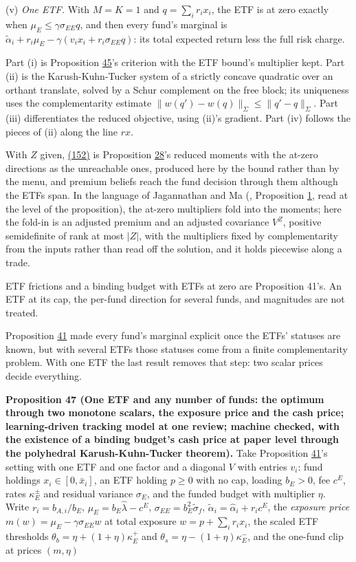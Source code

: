 \documentclass[11pt]{article}
\begin{document}
(v) \emph{One ETF.} With \(M=K=1\) and \(q=\sum_ir_ix_i\), the ETF is at zero exactly
when \(\mu_E\leq\gamma\sigma_{EE}q\), and then every fund's marginal is
\(\tilde\alpha_i+r_i\mu_E-\gamma(v_ix_i+r_i\sigma_{EE}q)\): its total expected return less
the full risk charge.

Part (i) is Proposition \hyperref[res:Proposition-45]{45}'s criterion with the ETF bound's multiplier
kept. Part (ii) is the Karush-Kuhn-Tucker system of a strictly concave
quadratic over an orthant translate, solved by a Schur complement on
the free block; its uniqueness uses the complementarity estimate
\(\|w(q')-w(q)\|_\Sigma\leq\|q'-q\|_\Sigma\). Part (iii) differentiates the reduced
objective, using (ii)'s gradient. Part (iv) follows the pieces of (ii)
along the line \(rx\).

With \(Z\) given, \hyperref[eq:152]{(152)} is Proposition \hyperref[res:Proposition-28]{28}'s reduced moments with the at-zero
directions as the unreachable ones, produced here by the bound rather
than by the menu, and premium beliefs reach the fund decision through
them although the ETFs span. In the language of Jagannathan and Ma
(\cite{jagannathan2003risk}, Proposition \hyperref[res:Proposition-1]{1}, read at the level of the
proposition), the at-zero multipliers fold into the moments; here the
fold-in is an adjusted premium and an adjusted covariance \(V^Z\),
positive semidefinite of rank at most \(|Z|\), with the multipliers fixed
by complementarity from the inputs rather than read off the solution,
and it holds piecewise along a trade.

ETF frictions and a binding budget with ETFs at zero are Proposition
41's. An ETF at its cap, the per-fund direction for several funds, and
magnitudes are not treated.

Proposition \hyperref[res:Proposition-41]{41} made every fund's marginal explicit once the ETFs'
statuses are known, but with several ETFs those statuses come from a
finite complementarity problem. With one ETF the last result removes
that step: two scalar prices decide everything.

\label{res:Proposition-47}
\textbf{Proposition 47 (One ETF and any number of funds: the optimum through two monotone scalars, the exposure price and the cash price; learning-driven tracking model at one review; machine checked, with the existence of a binding budget's cash price at paper level through the polyhedral Karush-Kuhn-Tucker theorem).}
Take Proposition \hyperref[res:Proposition-41]{41}'s setting with one ETF and one factor and a
diagonal \(V\) with entries \(v_i\): fund holdings \(x_i\in[0,\bar x_i]\), an ETF
holding \(p\geq0\) with no cap, loading \(b_E>0\), fee \(c^E\), rates \(\kappa^\pm_E\) and
residual variance \(\sigma_E\), and the funded budget with multiplier \(\eta\).
Write \(r_i=b_{A,i}/b_E\), \(\mu_E=b_E\hat\lambda-c^E\), \(\sigma_{EE}=b_E^2\tilde\sigma_f\),
\(\tilde\alpha_i=\hat\alpha_i+r_ic^E\), the \emph{exposure price}
\(m(w)=\mu_E-\gamma\sigma_{EE}w\) at total exposure \(w=p+\sum_ir_ix_i\), the scaled ETF
thresholds \(\theta_b=\eta+(1+\eta)\kappa^+_E\) and \(\theta_s=\eta-(1+\eta)\kappa^-_E\), and the
one-fund clip at prices \((m,\eta)\)
\end{document}
